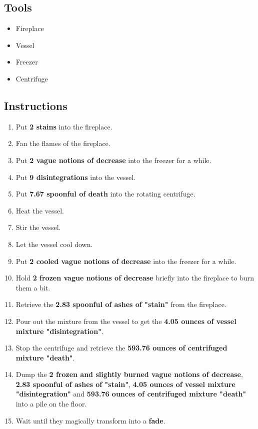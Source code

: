 \documentclass{article}
\begin{document}
\subsection{Tools}\begin{itemize}
\item 
Fireplace
\item 
Vessel
\item 
Freezer
\item 
Centrifuge
\end{itemize}
\subsection{Instructions}\begin{enumerate}
\item 
Put \textbf{2 stains} into the fireplace.
\item 
Fan the flames of the fireplace.
\item 
Put \textbf{2 vague notions of decrease} into the freezer for a while.
\item 
Put \textbf{9 disintegrations} into the vessel.
\item 
Put \textbf{7.67 spoonful of death} into the rotating centrifuge.
\item 
Heat the vessel.
\item 
Stir the vessel.
\item 
Let the vessel cool down.
\item 
Put \textbf{2 cooled vague notions of decrease} into the freezer for a while.
\item 
Hold \textbf{2 frozen vague notions of decrease} briefly into the fireplace to burn them a bit.
\item 
Retrieve the \textbf{2.83 spoonful of ashes of "stain"} from the fireplace.
\item 
Pour out the mixture from the vessel to get the \textbf{4.05 ounces of vessel mixture "disintegration"}.
\item 
Stop the centrifuge and retrieve the \textbf{593.76 ounces of centrifuged mixture "death"}.
\item 
Dump the \textbf{2 frozen and slightly burned vague notions of decrease}, \textbf{2.83 spoonful of ashes of "stain"}, \textbf{4.05 ounces of vessel mixture "disintegration"} and \textbf{593.76 ounces of centrifuged mixture "death"} into a pile on the floor.
\item 
Wait until they magically transform into a \textbf{fade}.
\end{enumerate}
\newpage
\end{document}
